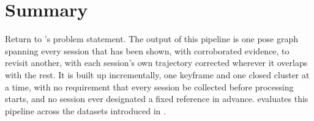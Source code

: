 \section{Summary}
\label{sec:method-summary}

Return to 's problem statement. The output of this pipeline
is one pose graph spanning every session that has been shown, with corroborated evidence, to
revisit another, with each session's own trajectory corrected wherever it overlaps with the
rest. It is built up incrementally, one keyframe and one closed cluster at a time, with no
requirement that every session be collected before processing starts, and no session ever
designated a fixed reference in advance.  evaluates this
pipeline across the datasets introduced in .